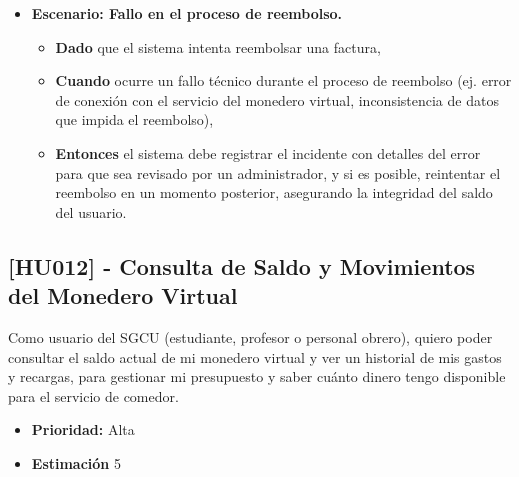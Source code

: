 \documentclass[12pt]{article}
\begin{document}
\begin{itemize}
	\item \textbf{Escenario: Fallo en el proceso de reembolso.}
	\begin{itemize}
		\item \textbf{Dado} que el sistema intenta reembolsar una factura,
		\item \textbf{Cuando} ocurre un fallo técnico durante el proceso de reembolso (ej. error de conexión con el servicio del monedero virtual, inconsistencia de datos que impida el reembolso),
		\item \textbf{Entonces} el sistema debe registrar el incidente con detalles del error para que sea revisado por un administrador, y si es posible, reintentar el reembolso en un momento posterior, asegurando la integridad del saldo del usuario.
	\end{itemize}
\end{itemize}

\pagebreak

\subsection{[HU012] - Consulta de Saldo y Movimientos del Monedero Virtual}

Como usuario del SGCU (estudiante, profesor o personal obrero), quiero poder consultar el saldo actual de mi monedero virtual y ver un historial de mis gastos y recargas, para gestionar mi presupuesto y saber cuánto dinero tengo disponible para el servicio de comedor.

\begin{itemize}
	\item \textbf{Prioridad:} Alta
	\item \textbf{Estimación} 5
\end{itemize}
\end{document}
